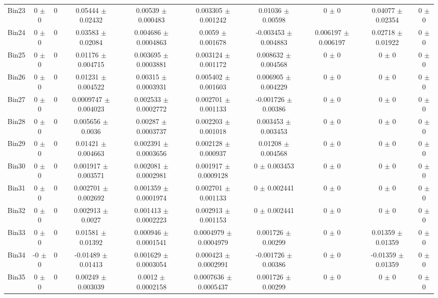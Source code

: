 \begin{tabular}{@{\extracolsep{4pt}}lccccccccc@{}}
     Bin23 & 0 $\pm$ 0 & 0 & 0.05444 $\pm$ 0.02432 & 0.00539 $\pm$ 0.000483 & 0.003305 $\pm$ 0.001242 & 0.01036 $\pm$ 0.00598 & 0 $\pm$ 0 & 0.04077 $\pm$ 0.02354 & 0 $\pm$ 0 \\ 
     Bin24 & 0 $\pm$ 0 & 0 & 0.03583 $\pm$ 0.02084 & 0.004686 $\pm$ 0.0004863 & 0.0059 $\pm$ 0.001678 & -0.003453 $\pm$ 0.004883 & 0.006197 $\pm$ 0.006197 & 0.02718 $\pm$ 0.01922 & 0 $\pm$ 0 \\ 
     Bin25 & 0 $\pm$ 0 & 0 & 0.01176 $\pm$ 0.004715 & 0.003695 $\pm$ 0.0003881 & 0.003124 $\pm$ 0.001172 & 0.008632 $\pm$ 0.004568 & 0 $\pm$ 0 & 0 $\pm$ 0 & 0 $\pm$ 0 \\ 
     Bin26 & 0 $\pm$ 0 & 0 & 0.01231 $\pm$ 0.004522 & 0.00315 $\pm$ 0.0003931 & 0.005402 $\pm$ 0.001603 & 0.006905 $\pm$ 0.004229 & 0 $\pm$ 0 & 0 $\pm$ 0 & 0 $\pm$ 0 \\ 
     Bin27 & 0 $\pm$ 0 & 0 & 0.0009747 $\pm$ 0.004023 & 0.002533 $\pm$ 0.0002772 & 0.002701 $\pm$ 0.001133 & -0.001726 $\pm$ 0.00386 & 0 $\pm$ 0 & 0 $\pm$ 0 & 0 $\pm$ 0 \\ 
     Bin28 & 0 $\pm$ 0 & 0 & 0.005656 $\pm$ 0.0036 & 0.00287 $\pm$ 0.0003737 & 0.002203 $\pm$ 0.001018 & 0.003453 $\pm$ 0.003453 & 0 $\pm$ 0 & 0 $\pm$ 0 & 0 $\pm$ 0 \\ 
     Bin29 & 0 $\pm$ 0 & 0 & 0.01421 $\pm$ 0.004663 & 0.002391 $\pm$ 0.0003656 & 0.002128 $\pm$ 0.000937 & 0.01208 $\pm$ 0.004568 & 0 $\pm$ 0 & 0 $\pm$ 0 & 0 $\pm$ 0 \\ 
     Bin30 & 0 $\pm$ 0 & 0 & 0.001917 $\pm$ 0.003571 & 0.002081 $\pm$ 0.0002981 & 0.001917 $\pm$ 0.0009128 & 0 $\pm$ 0.003453 & 0 $\pm$ 0 & 0 $\pm$ 0 & 0 $\pm$ 0 \\ 
     Bin31 & 0 $\pm$ 0 & 0 & 0.002701 $\pm$ 0.002692 & 0.001359 $\pm$ 0.0001974 & 0.002701 $\pm$ 0.001133 & 0 $\pm$ 0.002441 & 0 $\pm$ 0 & 0 $\pm$ 0 & 0 $\pm$ 0 \\ 
     Bin32 & 0 $\pm$ 0 & 0 & 0.002913 $\pm$ 0.0027 & 0.001413 $\pm$ 0.0002223 & 0.002913 $\pm$ 0.001153 & 0 $\pm$ 0.002441 & 0 $\pm$ 0 & 0 $\pm$ 0 & 0 $\pm$ 0 \\ 
     Bin33 & 0 $\pm$ 0 & 0 & 0.01581 $\pm$ 0.01392 & 0.000946 $\pm$ 0.0001541 & 0.0004979 $\pm$ 0.0004979 & 0.001726 $\pm$ 0.00299 & 0 $\pm$ 0 & 0.01359 $\pm$ 0.01359 & 0 $\pm$ 0 \\ 
     Bin34 & -0 $\pm$ 0 & 0 & -0.01489 $\pm$ 0.01413 & 0.001629 $\pm$ 0.0003054 & 0.000423 $\pm$ 0.0002991 & -0.001726 $\pm$ 0.00386 & 0 $\pm$ 0 & -0.01359 $\pm$ 0.01359 & 0 $\pm$ 0 \\ 
     Bin35 & 0 $\pm$ 0 & 0 & 0.00249 $\pm$ 0.003039 & 0.0012 $\pm$ 0.0002158 & 0.0007636 $\pm$ 0.0005437 & 0.001726 $\pm$ 0.00299 & 0 $\pm$ 0 & 0 $\pm$ 0 & 0 $\pm$ 0 \\ 

\end{tabular}
